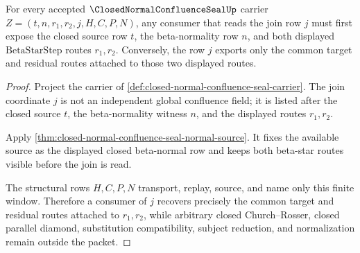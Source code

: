 \begin{theorem}
\label{thm:closed-normal-confluence-seal-join-window-inversion}
For every accepted $\ClosedNormalConfluenceSealUp$ carrier
$Z=(t,n,r_1,r_2,j,H,C,P,N)$, any consumer that reads the join row $j$ must first
expose the closed source row $t$, the beta-normality row $n$, and both displayed
$\mathrm{BetaStarStep}$ routes $r_1,r_2$. Conversely, the row $j$ exports only
the common target and residual routes attached to those two displayed routes.
\end{theorem}
\begin{proof}
Project the carrier of
\autoref{def:closed-normal-confluence-seal-carrier}. The join coordinate $j$ is
not an independent global confluence field; it is listed after the closed source
$t$, the beta-normality witness $n$, and the displayed routes $r_1,r_2$.

Apply \autoref{thm:closed-normal-confluence-seal-normal-source}. It fixes the
available source as the displayed closed beta-normal row and keeps both
beta-star routes visible before the join is read.

The structural rows $H,C,P,N$ transport, replay, source, and name only this
finite window. Therefore a consumer of $j$ recovers precisely the common target
and residual routes attached to $r_1,r_2$, while arbitrary closed
Church--Rosser, closed parallel diamond, substitution compatibility, subject
reduction, and normalization remain outside the packet.
\end{proof}

